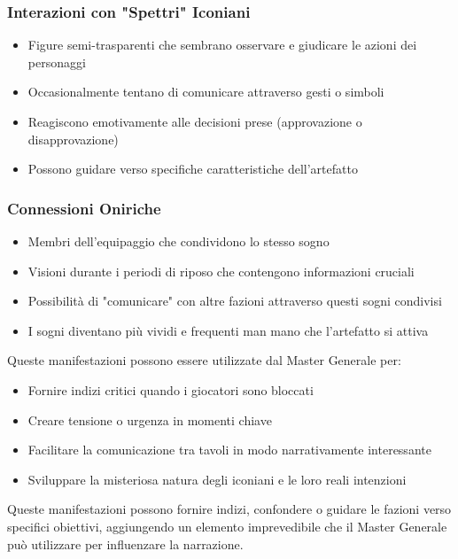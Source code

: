 \documentclass[letterpaper,twocolumn,openany,nodeprecatedcode]{dndbook}
\begin{document}
\subsubsection{Interazioni con "Spettri" Iconiani}
    \begin{itemize}
        \item Figure semi-trasparenti che sembrano osservare e giudicare le azioni dei personaggi
        \item Occasionalmente tentano di comunicare attraverso gesti o simboli
        \item Reagiscono emotivamente alle decisioni prese (approvazione o disapprovazione)
        \item Possono guidare verso specifiche caratteristiche dell'artefatto
    \end{itemize}

\subsubsection{Connessioni Oniriche}
    \begin{itemize}
        \item Membri dell'equipaggio che condividono lo stesso sogno
        \item Visioni durante i periodi di riposo che contengono informazioni cruciali
        \item Possibilità di "comunicare" con altre fazioni attraverso questi sogni condivisi
        \item I sogni diventano più vividi e frequenti man mano che l'artefatto si attiva
    \end{itemize}

Queste manifestazioni possono essere utilizzate dal Master Generale per:
\begin{itemize}
    \item Fornire indizi critici quando i giocatori sono bloccati
    \item Creare tensione o urgenza in momenti chiave
    \item Facilitare la comunicazione tra tavoli in modo narrativamente interessante
    \item Sviluppare la misteriosa natura degli iconiani e le loro reali intenzioni
\end{itemize}

Queste manifestazioni possono fornire indizi, confondere o guidare le fazioni verso specifici obiettivi, aggiungendo un elemento imprevedibile che il Master Generale può utilizzare per influenzare la narrazione.
\end{document}
